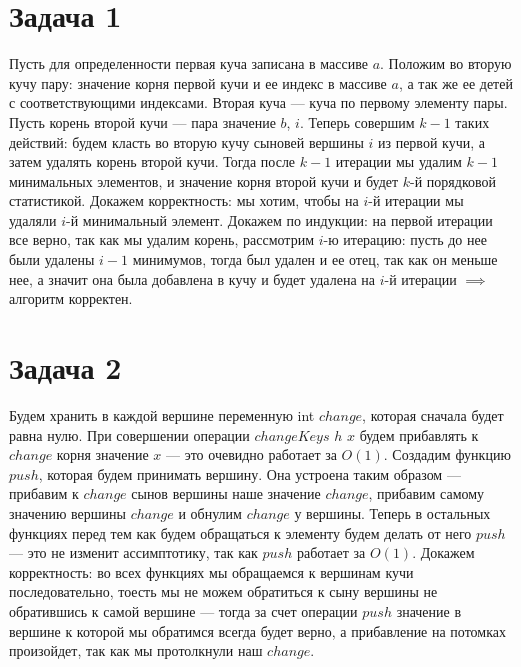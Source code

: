 \documentclass{article}
\begin{document}
 
\noindent 
\large 
\onehalfspacing  
\section{Задача 1}
Пусть для определенности первая куча записана в массиве $a$. Положим во вторую кучу пару: значение корня первой кучи и ее индекс в массиве $a$, а так же ее детей с соответствующими индексами. Вторая куча --- куча по первому элементу пары. Пусть корень второй кучи --- пара значение $b$, $i$. Теперь совершим $k-1$ таких действий: будем класть во вторую кучу сыновей вершины $i$ из первой кучи, а затем удалять корень второй кучи. Тогда после $k-1$ итерации мы удалим $k-1$ минимальных элементов, и значение корня второй кучи и будет $k$-й порядковой статистикой.\newline
Докажем корректность: мы хотим, чтобы на $i$-й итерации мы удаляли $i$-й минимальный элемент. Докажем по индукции: на первой итерации все верно, так как мы удалим корень, рассмотрим $i$-ю итерацию: пусть до нее были удалены $i-1$ минимумов, тогда был удален и ее отец, так как он меньше нее, а значит она была добавлена в кучу и будет удалена на $i$-й итерации $\implies$ алгоритм корректен.
\section{Задача 2}
Будем хранить в каждой вершине переменную int $change$, которая сначала будет равна нулю. При совершении операции $changeKeys$ $h$ $x$ будем прибавлять к $change$ корня значение $x$ --- это очевидно работает за $O(1)$.\newline
Создадим функцию $push$, которая будем принимать вершину. Она устроена таким образом --- прибавим к $change$ сынов вершины наше значение $change$, прибавим самому значению вершины $change$ и обнулим $change$ у вершины.\newline
Теперь в остальных функциях перед тем как будем обращаться к элементу будем делать от него $push$ --- это не изменит ассимптотику, так как $push$ работает за $O(1)$.\newline 
Докажем корректность: во всех функциях мы обращаемся к вершинам кучи последовательно, тоесть мы не можем обратиться к сыну вершины не обратившись к самой вершине --- тогда за счет операции $push$ значение в вершине к которой мы обратимся всегда будет верно, а прибавление на потомках произойдет, так как мы протолкнули наш $change$.
\end{document}
